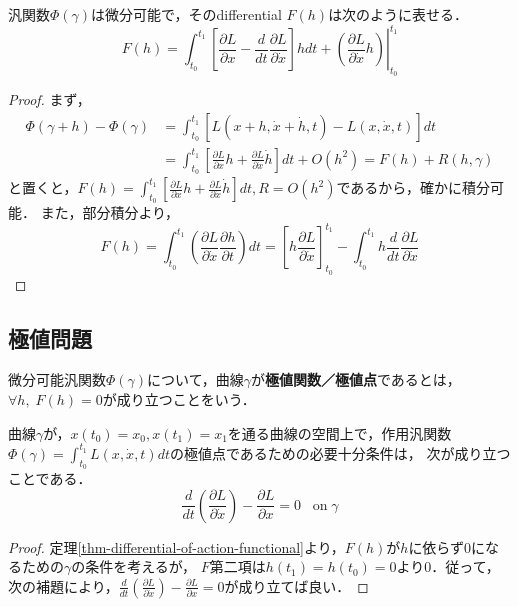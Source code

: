 \documentclass[uplatex,dvipdfmx]{jsreport}
\begin{document}
\begin{theorem}\label{thm-differential-of-action-functional}
    汎関数$\Phi(\gamma)$は微分可能で，そのdifferential $F(h)$は次のように表せる．
    \[ F(h) = \int^{t_1}_{t_0}\left.\left[ \frac{\partial L}{\partial x}-\frac{d}{dt}\frac{\partial L}{\partial\dot{x}} \right]hdt+\left(\frac{\partial L}{\partial\dot{x}}h\right) \right|^{t_1}_{t_0} \]
\end{theorem}
\begin{proof}
    まず，
    \begin{align*}
        \Phi(\gamma+h)-\Phi(\gamma) &= \int^{t_1}_{t_0}\left[L(x+h,\dot{x}+\dot{h},t)-L(x,\dot{x},t)\right]dt\\
        &= \int^{t_1}_{t_0}\left[\frac{\partial L}{\partial x}h+\frac{\partial L}{\partial\dot{x}}\dot{h}\right]dt + O(h^2) = F(h) + R(h,\gamma)
    \end{align*}
    と置くと，$F(h)=\int^{t_1}_{t_0}\left[\frac{\partial L}{\partial x}h+\frac{\partial L}{\partial\dot{x}}\dot{h}\right]dt, R=O(h^2)$であるから，確かに積分可能．
    また，部分積分より，
    \[ F(h) = \int^{t_1}_{t_0}\left( \frac{\partial L}{\partial\dot{x}}\frac{\partial h}{\partial t} \right)dt = \left[ h\frac{\partial L}{\partial\dot{x}} \right]^{t_1}_{t_0} - \int^{t_1}_{t_0} h\frac{d}{dt}\frac{\partial L}{\partial\dot{x}} \]
\end{proof}

\subsection{極値問題}

\begin{definition}[extremal]
    微分可能汎関数$\Phi(\gamma)$について，曲線$\gamma$が\textbf{極値関数／極値点}であるとは，$\forall h,\; F(h)=0$が成り立つことをいう．
\end{definition}

\begin{theorem}\label{thm-EL-equation}
    曲線$\gamma$が，$x(t_0)=x_0,x(t_1)=x_1$を通る曲線の空間上で，作用汎関数$\Phi(\gamma)=\int^{t_1}_{t_0}L(x,\dot{x},t)dt$の極値点であるための必要十分条件は，
    次が成り立つことである．
    \[ \frac{d}{dt}\left(\frac{\partial L}{\partial\dot{x}}\right) - \frac{\partial L}{\partial x} = 0\;\;\;\mathrm{on\;}\gamma \]
\end{theorem}
\begin{proof}
    定理\ref{thm-differential-of-action-functional}より，$F(h)$が$h$に依らず$0$になるための$\gamma$の条件を考えるが，
    $F$第二項は$h(t_1)=h(t_0)=0$より$0$．従って，次の補題により，$\frac{d}{dt}\left(\frac{\partial L}{\partial\dot{x}}\right) - \frac{\partial L}{\partial x} = 0$が成り立てば良い．
\end{proof}
\end{document}
